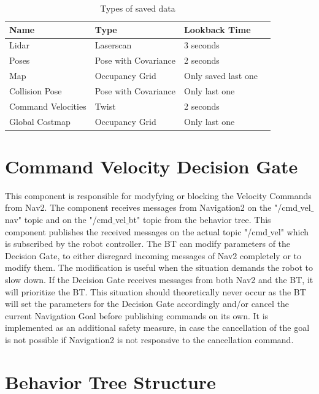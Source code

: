 \begin{center}
\begin{table}[ht]
	\label{tab:data_backup_types}
	\caption{Types of saved data}
	\begin{tabular}{ | m{} | m{}| m{} | m{} |} 
  	\hline
  	\textbf{Name} & \textbf{Type} & \textbf{Lookback Time} \\ 
  	\hline
  	Lidar & Laserscan & 3 seconds \\
  	\hline
  	Poses & Pose with Covariance & 2 seconds\\ 
  	\hline
  	Map & Occupancy Grid & Only saved last one \\ 
  	\hline
  	Collision Pose & Pose with Covariance & Only last one \\
  	\hline
  	Command Velocities & Twist & 2 seconds\\
  	\hline  	
  	Global Costmap & Occupancy Grid & Only last one \\
  	\hline
	\end{tabular}
\end{table}
\end{center}


\section{Command Velocity Decision Gate}

This component is responsible for modyfying or blocking the Velocity Commands from Nav2. The component receives messages from Navigation2 on the "/cmd$\_$vel$\_$nav" topic and on the "/cmd$\_$vel$\_$bt" topic from the behavior tree. This component publishes the received messages on the actual topic "/cmd$\_$vel" which is subscribed by the robot controller. 
The BT can modify parameters of the Decision Gate, to either disregard incoming messages of Nav2 completely or to modify them. The modification is useful when the situation demands the robot to slow down. If the Decision Gate receives messages from both Nav2 and the BT, it will prioritize the BT. This situation should theoretically never occur as the BT will set the parameters for the Decision Gate accordingly and/or cancel the current Navigation Goal before publishing commands on its own. It is implemented as an additional safety measure, in case the cancellation of the goal is not possible if Navigation2 is not responsive to the cancellation command. 

\section{Behavior Tree Structure}

